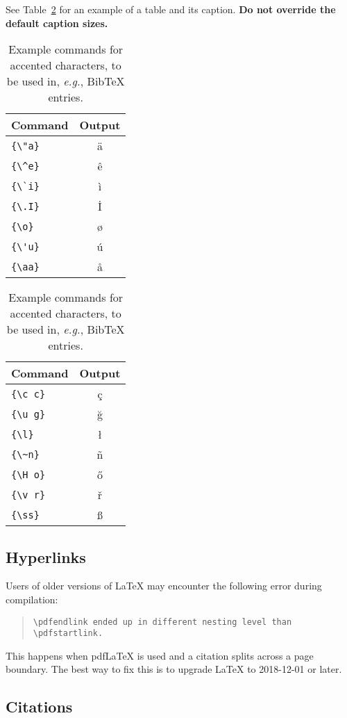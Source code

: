 \documentclass[11pt]{article}
\begin{document}
See Table~\ref{tab:accents} for an example of a table and its caption.
\textbf{Do not override the default caption sizes.}

\begin{table}
\centering
\begin{tabular}{lc}
\hline
\textbf{Command} & \textbf{Output}\\
\hline
\verb|{\"a}| & {\"a} \\
\verb|{\^e}| & {\^e} \\
\verb|{\`i}| & {\`i} \\ 
\verb|{\.I}| & {\.I} \\ 
\verb|{\o}| & {\o} \\
\verb|{\'u}| & {\'u}  \\ 
\verb|{\aa}| & {\aa}  \\\hline
\end{tabular}
\begin{tabular}{lc}
\hline
\textbf{Command} & \textbf{Output}\\
\hline
\verb|{\c c}| & {\c c} \\ 
\verb|{\u g}| & {\u g} \\ 
\verb|{\l}| & {\l} \\ 
\verb|{\~n}| & {\~n} \\ 
\verb|{\H o}| & {\H o} \\ 
\verb|{\v r}| & {\v r} \\ 
\verb|{\ss}| & {\ss} \\
\hline
\end{tabular}
\caption{Example commands for accented characters, to be used in, \emph{e.g.}, Bib\TeX{} entries.}
\label{tab:accents}
\end{table}

\subsection{Hyperlinks}

Users of older versions of \LaTeX{} may encounter the following error during compilation: 
\begin{quote}
\tt\verb|\pdfendlink| ended up in different nesting level than \verb|\pdfstartlink|.
\end{quote}
This happens when pdf\LaTeX{} is used and a citation splits across a page boundary. The best way to fix this is to upgrade \LaTeX{} to 2018-12-01 or later.

\subsection{Citations}
\end{document}
